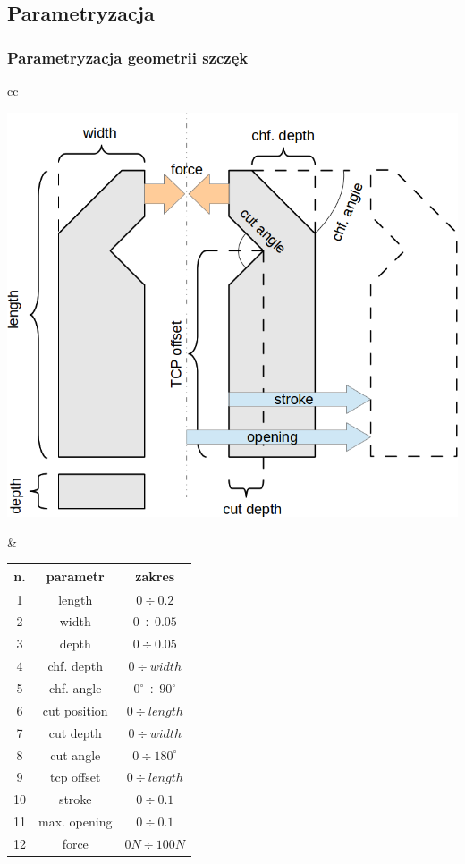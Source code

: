 \documentclass[12pt,a4paper,portrait]{beamer}
\begin{document}
\subsection{Parametryzacja}
\begin{frame}
\frametitle{Parametryzacja geometrii szczęk}
\begin{tabular}{cc}
\begin{minipage}{0.5\textwidth}
\includegraphics[width=1\textwidth]{images/parametrization}
\end{minipage} &
\begin{minipage}{0.5\textwidth}
\begin{tabular}{c|c|c}
\textbf{n.} & \textbf{parametr} & \textbf{zakres} \\ \hline \hline
1 & length & $0 \div 0.2$ \\ \hline
2 & width & $0 \div 0.05$ \\ \hline
3 & depth & $0 \div 0.05$ \\ \hline
4 & chf. depth & $0 \div width$ \\ \hline
5 & chf. angle & $0^\circ \div 90^\circ$ \\ \hline
6 & cut position & $0 \div length$ \\ \hline
7 & cut depth & $0 \div width$ \\ \hline
8 & cut angle & $0 \div 180^\circ$ \\ \hline
9 & tcp offset & $0 \div length$ \\ \hline
10 & stroke & $0 \div 0.1$ \\ \hline
11 & max. opening & $0 \div 0.1$ \\ \hline
12 & force & $0 N \div 100 N$
\end{tabular}
\end{minipage}
\end{tabular}
\end{frame}
\end{document}
